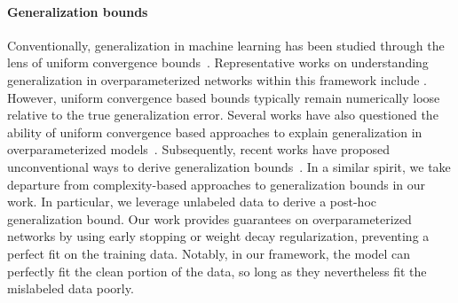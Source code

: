 \paragraph{Generalization bounds}
Conventionally, generalization in machine learning 
has been studied through the lens of uniform 
convergence bounds~\citep{blumer1989learnability, vapnik1999overview}.  
Representative works on understanding generalization 
in overparameterized networks
within this framework
include 
\citet{neyshabur2015norm,neyshabur2017pac,neyshabur2017exploring,neyshabur2018role,dziugaite2017computing, bartlett2017spectrally,arora2018stronger,li2018learning,zhou2018non, allen2019learning,nagarajan2019deterministic}. 
However, uniform convergence based 
bounds typically remain numerically 
loose relative to the true generalization error. 
Several works have also questioned the ability of 
uniform convergence based approaches to 
explain generalization in overparameterized models~\citep{zhang2016understanding,nagarajan2019uniform}. 
% 
% 
Subsequently, recent works have proposed 
unconventional ways to derive generalization bounds~\citep{negrea2020defense,zhou2020uniform}. 
In a similar spirit, we take departure from 
complexity-based approaches to generalization bounds  
in our work. 
In particular, we leverage unlabeled data 
to derive a post-hoc generalization bound.  
Our work provides 
guarantees on overparameterized networks 
by using early stopping or weight decay regularization, 
preventing a perfect fit on the training data.  
Notably, in our framework, the model
can perfectly fit the clean portion of the data,
so long as they nevertheless fit the mislabeled data poorly.



